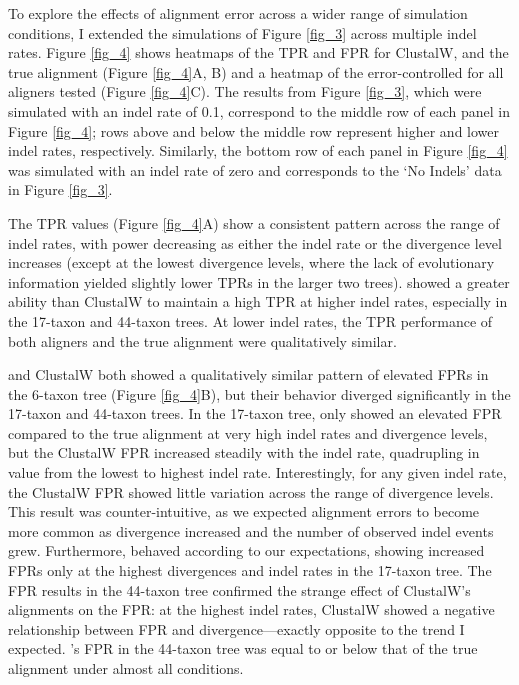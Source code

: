 To explore the effects of alignment error across a wider range of
simulation conditions, I extended the simulations of Figure
\ref{fig_3} across multiple indel rates. Figure \ref{fig_4} shows
heatmaps of the TPR and FPR for ClustalW, \prankc and the true
alignment (Figure \ref{fig_4}A, B) and a heatmap of the
error-controlled \tpr for all aligners tested (Figure \ref{fig_4}C).
  The results from
Figure \ref{fig_3}, which were simulated with an indel rate of 0.1,
correspond to the middle row of each panel in Figure \ref{fig_4}; rows
above and below the middle row represent higher and lower indel rates,
respectively. Similarly, the bottom row of each panel in Figure
\ref{fig_4} was simulated with an indel rate of zero and corresponds
to the `No Indels' data in Figure \ref{fig_3}.

The TPR values (Figure \ref{fig_4}A) show a consistent pattern
across the range of indel rates, with power decreasing as either the
indel rate or the divergence level increases (except at the lowest
divergence levels, where the lack of evolutionary information yielded
slightly lower TPRs in the larger two trees). \prankc{} showed a
greater ability than ClustalW to maintain a high TPR at higher indel
rates, especially in the 17-taxon and 44-taxon trees. At lower indel
rates, the TPR performance of both aligners and the true alignment
were qualitatively similar.

\prankc{} and ClustalW both showed a qualitatively similar pattern of
elevated FPRs in the 6-taxon tree (Figure \ref{fig_4}B), but their
behavior diverged significantly in the 17-taxon and 44-taxon trees. In
the 17-taxon tree, \prankc{} only showed an elevated FPR compared to
the true alignment at very high indel rates and divergence levels, but
the ClustalW FPR increased steadily with the indel rate, quadrupling
in value from the lowest to highest indel rate. Interestingly, for any
given indel rate, the ClustalW FPR showed little variation across the
range of divergence levels. This result was counter-intuitive, as we
expected alignment errors to become more common as divergence
increased and the number of observed indel events grew. Furthermore,
\prankc{} behaved according to our expectations, showing increased
FPRs only at the highest divergences and indel rates in the 17-taxon
tree. The FPR results in the 44-taxon tree confirmed the strange
effect of ClustalW's alignments on the \sw FPR: at the highest indel
rates, ClustalW showed a negative relationship between FPR and
divergence---exactly opposite to the trend I expected. \prankc{}'s
FPR in the 44-taxon tree was equal to or below that of the true
alignment under almost all conditions.

